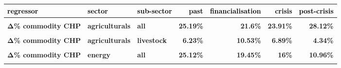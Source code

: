 \documentclass[
  authoryear,
  preprint,
  3p]{elsarticle}
\begin{document}
\begin{longtable}[t]{>{}l>{}l>{}l>{}r>{}r>{}r>{}r}
\toprule
\textcolor{black}{\textbf{regressor}} & \textcolor{black}{\textbf{sector}} & \textcolor{black}{\textbf{sub-sector}} & \textcolor{black}{\textbf{past}} & \textcolor{black}{\textbf{financialisation}} & \textcolor{black}{\textbf{crisis}} & \textcolor{black}{\textbf{post-crisis}}\\
\midrule
\textbf{\cellcolor{gray!10}{Δ\% commodity CHP}} & \textbf{\cellcolor{gray!10}{all}} & \textbf{\cellcolor{gray!10}{all}} & \textcolor[HTML]{4285f4}{\textbf{\cellcolor{gray!10}{25.79\%}}} & \textcolor[HTML]{4285f4}{\textbf{\cellcolor{gray!10}{20.72\%}}} & \textcolor[HTML]{4285f4}{\textbf{\cellcolor{gray!10}{22.46\%}}} & \textcolor[HTML]{4285f4}{\textbf{\cellcolor{gray!10}{27.17\%}}}\\
\textbf{Δ\% commodity CHP} & \textbf{agriculturals} & \textbf{all} & \textcolor[HTML]{4285f4}{\textbf{25.19\%}} & \textcolor[HTML]{4285f4}{\textbf{21.6\%}} & \textcolor[HTML]{4285f4}{\textbf{23.91\%}} & \textcolor[HTML]{4285f4}{\textbf{28.12\%}}\\
\textbf{\cellcolor{gray!10}{Δ\% commodity CHP}} & \textbf{\cellcolor{gray!10}{agriculturals}} & \textbf{\cellcolor{gray!10}{grains}} & \textcolor[HTML]{4285f4}{\textbf{\cellcolor{gray!10}{33.18\%}}} & \textcolor[HTML]{4285f4}{\textbf{\cellcolor{gray!10}{27.86\%}}} & \textcolor[HTML]{4285f4}{\textbf{\cellcolor{gray!10}{29.15\%}}} & \textcolor[HTML]{4285f4}{\textbf{\cellcolor{gray!10}{36.24\%}}}\\
\textbf{Δ\% commodity CHP} & \textbf{agriculturals} & \textbf{livestock} & \textcolor[HTML]{4285f4}{\textbf{6.23\%}} & \textcolor[HTML]{4285f4}{\textbf{10.53\%}} & \textcolor[HTML]{4285f4}{\textbf{6.89\%}} & \textcolor[HTML]{4285f4}{\textbf{4.34\%}}\\
\textbf{\cellcolor{gray!10}{Δ\% commodity CHP}} & \textbf{\cellcolor{gray!10}{agriculturals}} & \textbf{\cellcolor{gray!10}{softs}} & \textcolor[HTML]{4285f4}{\textbf{\cellcolor{gray!10}{26.68\%}}} & \textcolor[HTML]{4285f4}{\textbf{\cellcolor{gray!10}{20.89\%}}} & \textcolor[HTML]{4285f4}{\textbf{\cellcolor{gray!10}{27.19\%}}} & \textcolor[HTML]{4285f4}{\textbf{\cellcolor{gray!10}{31.88\%}}}\\
\addlinespace
\textbf{Δ\% commodity CHP} & \textbf{energy} & \textbf{all} & \textcolor[HTML]{4285f4}{\textbf{25.12\%}} & \textcolor[HTML]{4285f4}{\textbf{19.45\%}} & \textcolor[HTML]{4285f4}{\textbf{16\%}} & \textcolor[HTML]{4285f4}{\textbf{10.96\%}}\\
\textbf{\cellcolor{gray!10}{Δ\% commodity CHP}} & \textbf{\cellcolor{gray!10}{energy}} & \textbf{\cellcolor{gray!10}{gas}} & \textcolor[HTML]{4285f4}{\textbf{\cellcolor{gray!10}{19.69\%}}} & \textcolor[HTML]{4285f4}{\textbf{\cellcolor{gray!10}{15.65\%}}} & \textcolor[HTML]{4285f4}{\textbf{\cellcolor{gray!10}{7.36\%}}} & \textcolor[HTML]{4285f4}{\textbf{\cellcolor{gray!10}{5.29\%}}}\\

\end{longtable}
\end{document}
